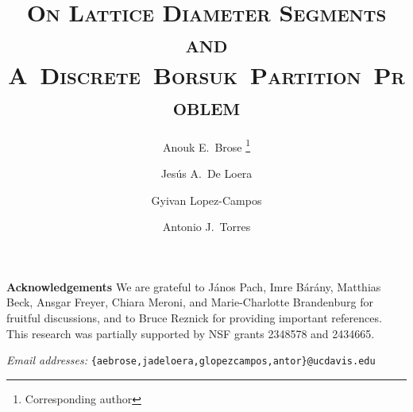 \documentclass[11pt]{article}
\title{\scshape On Lattice Diameter Segments and \mbox{A Discrete Borsuk Partition Problem}}
\date{}
\author[1]{Anouk E.~Brose \thanks{Corresponding author}}
\author[1]{Jes\'us A.~De Loera}
\author[1]{Gyivan Lopez-Campos}
\author[1]{Antonio J.~Torres}
\affil[1]{\small \scshape Department of Mathematics, University of California, Davis}
\begin{document}
\maketitle












\textbf{Acknowledgements}
We are grateful to János Pach, Imre Bárány, Matthias Beck, Ansgar Freyer, Chiara Meroni, and Marie-Charlotte Brandenburg for fruitful discussions, and to Bruce Reznick for providing important references.
This research was partially supported by NSF grants 2348578 and 2434665.



{ \linespread{1.0} \small }

\vspace{2ex}

\emph{Email addresses:} \texttt{\{aebrose,jadeloera,glopezcampos,antor\}@ucdavis.edu} 
\end{document}

